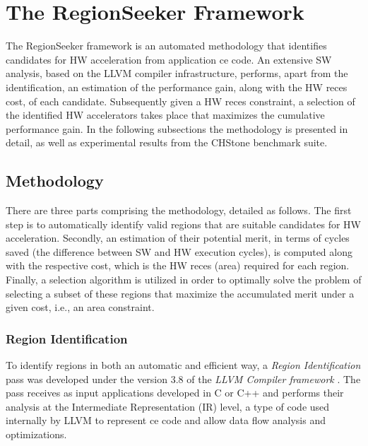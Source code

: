 \documentclass[]{usiinfthesis}
\begin{document}
\section{The RegionSeeker Framework}
\label{sec:rs}

The RegionSeeker framework is an automated methodology that 
identifies candidates for HW acceleration from application ce 
code. An extensive SW analysis, based on the LLVM compiler infrastructure,
performs, apart from
the identification, an estimation of the performance gain, along with
the HW reces cost, of each candidate. Subsequently given a HW reces
constraint, a selection of the identified HW accelerators takes place that
maximizes the cumulative performance gain.
In the following subsections the methodology is presented in detail, as well as
experimental results from the CHStone benchmark \cite{HaraMay08} suite.

\subsection{Methodology}
\label{subsec:meth}

There are three parts comprising the methodology, detailed as follows.
The first step is to automatically identify valid regions that are suitable candidates
for HW acceleration. Secondly, an estimation of their potential merit, in terms of cycles saved
(the difference between SW and HW execution cycles),
is computed along with the respective cost, which is the HW reces (area) required
for each region. Finally, a selection algorithm is utilized in order to optimally solve the 
problem of selecting a subset of these
regions that maximize the accumulated merit under a given cost, i.e., an area constraint.

\subsubsection{Region Identification}
\label{subsec:reg_id}

To identify regions in both an automatic and efficient way, a
 \emph{Region Identification} pass was developed under the version 3.8 
of the \emph{LLVM Compiler framework} \cite{LattnerMar04}. 
The pass receives as input applications developed in C or C++ and performs 
their analysis at the Intermediate Representation (IR) level, a type
of code used internally by LLVM to represent ce code and allow
data flow analysis and optimizations.\par
\end{document}
